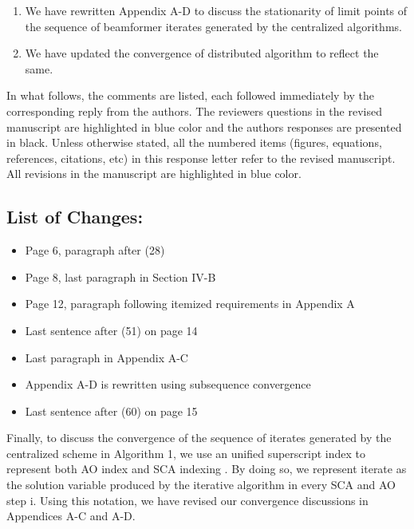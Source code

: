 \begin{enumerate}
	\item We have rewritten Appendix A-D to discuss the stationarity of limit points of the sequence of beamformer iterates generated by the centralized algorithms.
	\item We have updated the convergence of distributed algorithm to reflect the same.
\end{enumerate}

In what follows, the comments are listed, each followed immediately by the corresponding reply from the authors. The reviewers questions in the revised manuscript are highlighted in blue color and the authors responses are presented in black. Unless otherwise stated, all the numbered items (figures, equations, references, citations, etc) in this response letter refer to the revised manuscript. All revisions in the manuscript are highlighted in blue color.

\subsection*{List of Changes:}
\vspace*{1eM}
\begin{itemize}
	\item Page 6, paragraph after (28)
	\item Page 8, last paragraph in Section IV-B
	\item Page 12, paragraph following itemized requirements in Appendix A
	\item Last sentence after (51) on page 14
	\item Last paragraph in Appendix A-C
	\item Appendix A-D is rewritten using subsequence convergence
	\item Last sentence after (60) on page 15
\end{itemize}

Finally, to discuss the convergence of the sequence of iterates generated by the centralized scheme in Algorithm 1, we use an unified superscript index  to represent both \ac{AO} index  and \ac{SCA} indexing . By doing so, we represent iterate  as the solution variable produced by the iterative algorithm in every \ac{SCA}  and \ac{AO} step {i}. Using this notation, we have revised our convergence discussions in Appendices A-C and A-D. 
